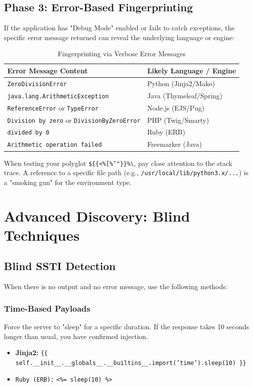 \documentclass{article}
\begin{document}
\subsection{Phase 3: Error-Based Fingerprinting}
If the application has "Debug Mode" enabled or fails to catch exceptions, the specific error message returned can reveal the underlying language or engine:

\begin{table}[h]
\centering
\small
\begin{tabular}{@{} l l @{}}
\toprule
\textbf{Error Message Content} & \textbf{Likely Language / Engine} \\
\midrule
\texttt{ZeroDivisionError} & Python (Jinja2/Mako) \\
\texttt{java.lang.ArithmeticException} & Java (Thymeleaf/Spring) \\
\texttt{ReferenceError} or \texttt{TypeError} & Node.js (EJS/Pug) \\
\texttt{Division by zero} or \texttt{DivisionByZeroError} & PHP (Twig/Smarty) \\
\texttt{divided by 0} & Ruby (ERB) \\
\texttt{Arithmetic operation failed} & Freemarker (Java) \\
\bottomrule
\end{tabular}
\caption{Fingerprinting via Verbose Error Messages}
\end{table}

\begin{infobox}
When testing your polyglot \texttt{\$\{\{<\%[\%'"\}\}\%\textbackslash}, pay close attention to the stack trace. A reference to a specific file path (e.g., \texttt{/usr/local/lib/python3.x/...}) is a "smoking gun" for the environment type.
\end{infobox}

\section{Advanced Discovery: Blind Techniques}

\subsection{Blind SSTI Detection}
When there is no output and no error message, use the following methods:

\subsubsection{Time-Based Payloads}
Force the server to "sleep" for a specific duration. If the response takes 10 seconds longer than usual, you have confirmed injection.
\begin{itemize}
    \item \textbf{Jinja2:} \texttt{\{\{ self.\_\_init\_\_.\_\_globals\_\_.\_\_builtins\_\_.import('time').sleep(10) \}\}}
    \item \texttt{Ruby (ERB):} \texttt{<\%= sleep(10) \%>}
\end{itemize}
\end{document}
